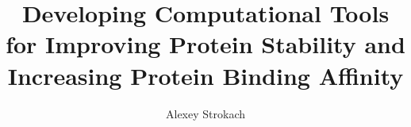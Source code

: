\documentclass{ut-thesis}
\author{Alexey Strokach}
\title{Developing Computational Tools for Improving Protein Stability and Increasing Protein Binding Affinity}
\begin{document}
\begin{preliminary}

	\maketitle






\end{preliminary}
\end{document}
